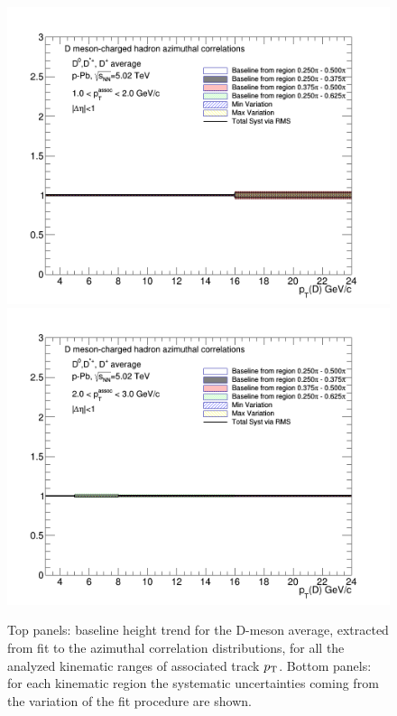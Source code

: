 \begin{figure}[!htbp]
{\includegraphics[width=0.49\linewidth, height=0.33\linewidth]{figures/FitOutput/BaselineSystematicSourcesPedestal_pthad1dotto2dot.png}}
{\includegraphics[width=0.49\linewidth, height=0.33\linewidth]{figures/FitOutput/BaselineSystematicSourcesPedestal_pthad2dotto3dot.png}}
\caption{Top panels: baseline height trend for the D-meson average, extracted from fit to the azimuthal correlation distributions, for all the analyzed kinematic ranges of associated track $p_{\rm T}$. Bottom panels: for each kinematic region the systematic uncertainties coming from the variation of the fit procedure are shown.}
\label{fig:baselineAverage}
\end{figure}

